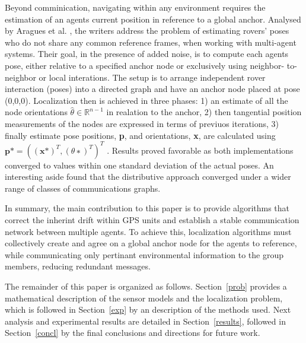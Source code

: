 Beyond comminication, navigating within any environment requires the estimation of an agents current position in reference to a global anchor. Analysed by Aragues et al. \cite{aragues2011multi}, the writers address the problem of estimating rovers’ poses who do not share any common reference frames, when working with multi-agent systems. Their goal, in the presence of added noise, is to compute each agents pose, either relative to a specified anchor node or exclusively using neighbor- to-neighbor or local interations. The setup is to arrange independent rover interaction (poses) into a directed graph and have an anchor node placed at pose (0,0,0). Localization then is achieved in three phases: 1) an estimate of all the node orientations $\hat{\theta} \in \mathbb{R}^{n-1}$ in realation to the anchor, 2) then tangential position measurements of the nodes are expressed in terms of previuos iterations, 3) finally estimate pose positions, \textbf{p}, and orientations, \textbf{x}, are calculated using $\textbf{p*} = ((\textbf{x*})^T , (\theta∗)^T )^T$ . Results proved favorable as both implementations converged to values within one standard deviation of the actual poses. An interesting aside found that the distributive approach converged under a wider range of classes of communications graphs.

In summary, the main contribution to this paper is to provide algorithms that correct the inherint drift within GPS units and establish a stable communication network between multiple agents. To achieve this, localization algorithms must collectively create and agree on a global anchor node for the agents to reference, while communicating only pertinant environmental information to the group members, reducing redundant messages.

The remainder of this paper is organized as follows. Section~\ref{prob} provides a mathematical description of the sensor models and the localization problem, which is followed in Section~\ref{exp} by an description of the methods used. Next analysis and experimental results are detailed in Section~\ref{results}, followed in Section~\ref{concl} by the final conclusions and directions for future work. 